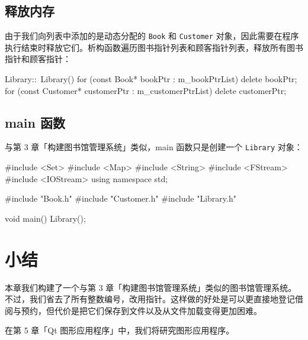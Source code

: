 \subsection{释放内存}

由于我们向列表中添加的是动态分配的 \texttt{Book} 和 \texttt{Customer} 对象，因此需要在程序执行结束时释放它们。析构函数遍历图书指针列表和顾客指针列表，释放所有图书指针和顾客指针：

\begin{codebox}
Library::~Library() {
  for (const Book* bookPtr : m_bookPtrList) {
    delete bookPtr;
  }
  for (const Customer* customerPtr : m_customerPtrList) {
    delete customerPtr;
  }
}
\end{codebox}

\subsection{main 函数}

与第 3 章「构建图书馆管理系统」类似，main 函数只是创建一个 \texttt{Library} 对象：

\medskip{}

\begin{codebox}
#include <Set>
#include <Map>
#include <String>
#include <FStream>
#include <IOStream>
using namespace std;

#include "Book.h"
#include "Customer.h"
#include "Library.h"

void main() {
  Library();
}
\end{codebox}

\section{小结}

本章我们构建了一个与第 3 章「构建图书馆管理系统」类似的图书馆管理系统。不过，我们省去了所有整数编号，改用指针。这样做的好处是可以更直接地登记借阅与预约，但代价是把它们保存到文件以及从文件加载变得更加困难。

在第 5 章「Qt 图形应用程序」中，我们将研究图形应用程序。
